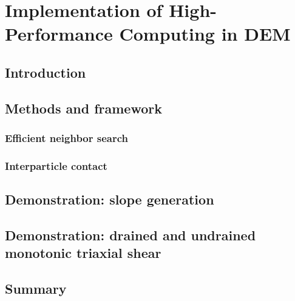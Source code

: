 \documentclass[../main]{subfiles}
\begin{document}
\chapter{Implementation of High-Performance Computing in DEM}
\label{ch:appendix_hpc}

\section{Introduction}
\label{sec:hpc_intro}

\section{Methods and framework}
\label{sec:hpc_methods}

\subsection{Efficient neighbor search}
\label{subsec:neighbor_search}

\subsection{Interparticle contact}
\label{subsec:contact_detection}

\section{Demonstration: slope generation}
\label{sec:hpc_slope}

\section{Demonstration: drained and undrained monotonic triaxial shear}
\label{sec:hpc_triaxial}

\section{Summary}
\label{sec:hpc_summary}
\end{document}
